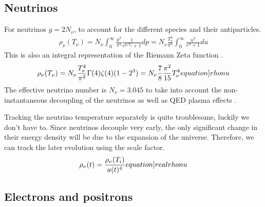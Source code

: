\subsection{Neutrinos}

For neutrinos $g=2N_\nu$, to account for the different species and their antiparticles.
\begin{align}
    \rho_\nu(T_\nu)=N_\nu\int_{0}^{\infty} \frac{p^3}{\pi^2}\frac{1}{e^{p/T_\nu}+1}dp =  N_\nu\frac{T_\nu^4}{\pi^2}\int_{0}^{\infty}\frac{u^3}{e^{u}+1}du
\end{align}
This is also an integral representation of the Riemann Zeta function \cite[\href{https://dlmf.nist.gov/25.5.E3}{(25.5.3)}]{NIST:DLMF}.
\begin{align}
    \rho_\nu(T_\nu)=N_\nu\frac{T_\nu^4}{\pi^2}\Gamma(4)\zeta(4)(1-2^3)=N_\nu\frac{7}{8}\frac{\pi^2}{15}T_\nu^4
    \label[equation]{rhonu}
\end{align}
The effective neutrino number is $N_\nu=3.045$ to take into account the non-instantaneous decoupling of the neutrinos as well as QED plasma effects \cite{de_Salas_2016}.

Tracking the neutrino temperature separately is quite troublesome, luckily we don't have to. Since neutrinos decouple very early, the only significant change in their energy density will be due to the expansion of the universe. Therefore, we can track the later evolution using the scale factor.
\begin{align}
    \rho_\nu(t)=\frac{\rho_\nu(T_i)}{a(t)^4}
    \label[equation]{realrhonu}
\end{align}



\subsection{Electrons and positrons}


